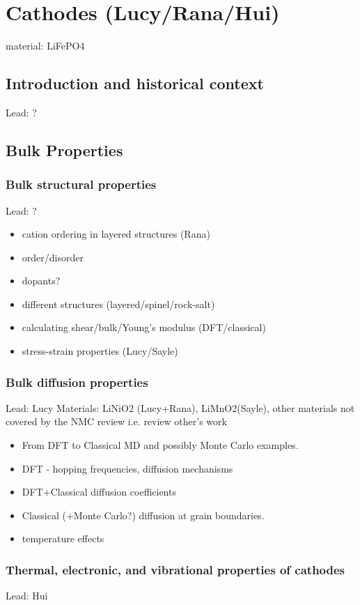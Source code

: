 \documentclass[journal=jacsat,manuscript=article]{achemso}
\begin{document}
\section{Cathodes (Lucy/Rana/Hui)}
material: LiFePO4
\subsection{Introduction and historical context}
Lead: ?

\subsection{Bulk Properties}
\subsubsection{Bulk structural properties}
Lead: ?
\begin{itemize}
    \item cation ordering in layered structures (Rana)
    \item order/disorder
    \item dopants?
    \item different structures (layered/spinel/rock-salt)
    \item calculating shear/bulk/Young's modulus (DFT/classical)
    \item stress-strain properties (Lucy/Sayle)
\end{itemize}

\subsubsection{Bulk diffusion properties}
Lead: Lucy
\newline
Materials: LiNiO2 (Lucy+Rana), LiMnO2(Sayle), other materials not covered by the NMC review i.e. review other's work

\begin{itemize}
    \item From DFT to Classical MD and possibly Monte Carlo examples.
    \item DFT - hopping frequencies, diffusion mechanisms
    \item DFT+Classical diffusion coefficients
    \item Classical (+Monte Carlo?) diffusion at grain boundaries.
    \item temperature effects
\end{itemize}

\subsubsection{Thermal, electronic, and vibrational properties of cathodes}
Lead: Hui
\end{document}

